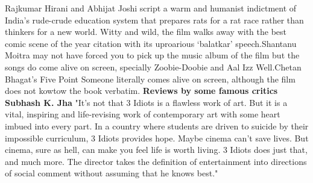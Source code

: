 Rajkumar Hirani and Abhijat Joshi script a warm and humanist indictment of India's rude-crude education system that prepares rats for a rat race rather than thinkers for a new world.
Witty and wild, the film walks away with the best comic scene of the year citation with its uproarious `balatkar' speech.Shantanu Moitra may not have forced you to pick up the music album of the film but the songs do come alive on screen, specially Zoobie-Doobie and Aal Izz Well.Chetan Bhagat's Five Point Someone literally comes alive on screen, although the film does not kowtow the book verbatim.
\textbf{Reviews by some famous critics}\\
\textbf{Subhash K. Jha }
"It's not that 3 Idiots is a flawless work of art. But it is a vital, inspiring and life-revising work of contemporary art with some heart imbued into every part. In a country where students are driven to suicide by their impossible curriculum, 3 Idiots provides hope. Maybe cinema can't save lives. But cinema, sure as hell, can make you feel life is worth living. 3 Idiots does just that, and much more. The director takes the definition of entertainment into directions of social comment without assuming that he knows best."

